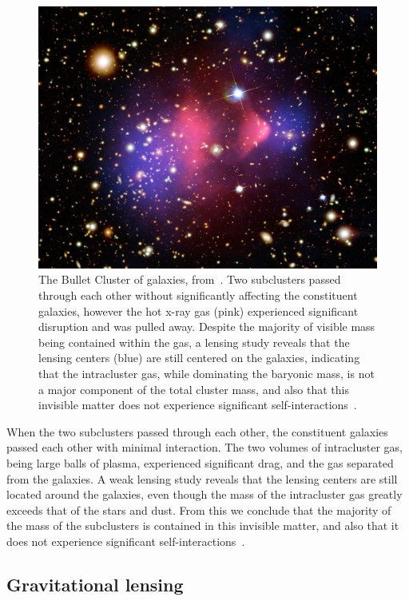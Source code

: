 \begin{figure}[htbp]
\centering
   \includegraphics{figures/dm/bullet_cluster}
   \caption{The Bullet Cluster of galaxies, from~\cite{bullet}. Two subclusters passed through each other without significantly affecting the constituent galaxies, however the hot x-ray gas (pink) experienced significant disruption and was pulled away. Despite the majority of visible mass being contained within the gas, a lensing study reveals that the lensing centers (blue) are still centered on the galaxies, indicating that the intracluster gas, while dominating the baryonic mass, is not a major component of the total cluster mass, and also that this invisible matter does not experience significant self-interactions~\cite{Kahlhoefer:2013dca}.}\label{fig:bullet_cluster}
\end{figure}

When the two subclusters passed through each other, the constituent galaxies passed each other with minimal interaction. The two volumes of intracluster gas, being large balls of plasma, experienced significant drag, and the gas separated from the galaxies. A weak lensing study reveals that the lensing centers are still located around the galaxies, even though the mass of the intracluster gas greatly exceeds that of the stars and dust. From this we conclude that the majority of the mass of the subclusters is contained in this invisible matter, and also that it does not experience significant self-interactions~\cite{Kahlhoefer:2013dca}.

\subsection{Gravitational lensing}

